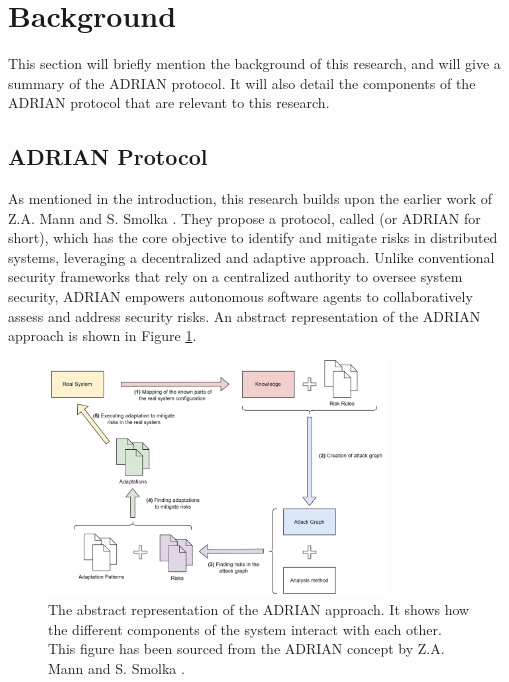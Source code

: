 \section{Background}
\label{sec:background}
This section will briefly mention the background of this research, and will give a summary of the ADRIAN protocol. It will also detail the components of the ADRIAN protocol that are relevant to this research.

\subsection{ADRIAN Protocol}
\label{ssec:adrian}

As mentioned in the introduction, this research builds upon the earlier work of Z.A. Mann and S. Smolka \cite{mann2023ADRIAN}. They propose a protocol, called \ADRIAN (or ADRIAN for short), which has the core objective to identify and mitigate risks in distributed systems, leveraging a decentralized and adaptive approach. Unlike conventional security frameworks that rely on a centralized authority to oversee system security, ADRIAN empowers autonomous software agents to collaboratively assess and address security risks. An abstract representation of the ADRIAN approach is shown in Figure \ref{fig:adrian-architecture}.

\begin{figure}
    \centering
    \includegraphics[width=0.8\textwidth]{content/adrian-architecture.png}
    \caption{The abstract representation of the ADRIAN approach. It shows how the different components of the system interact with each other. This figure has been sourced from the ADRIAN concept by Z.A. Mann and S. Smolka \cite{mann2023ADRIAN}.}
    \label{fig:adrian-architecture}
\end{figure}

